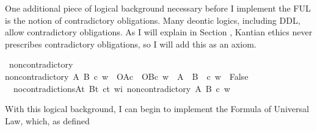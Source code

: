 \begin{isabellebody}
%
%
\begin{isamarkuptext}%
One additional piece of logical background necessary before I implement the FUL is the 
notion of contradictory obligations. Many deontic logics, including DDL, allow contradictory
obligations. As I will explain in Section , Kantian ethics never prescribes contradictory
obligations, so I will add this as an axiom.%
\end{isamarkuptext}\isamarkuptrue%
\isamarkupfalse%
\ non{\isacharunderscore}contradictory\ \ \isanewline
{\isachardoublequoteopen}non{\isacharunderscore}contradictory\ A\ B\ c\ w\ {\isasymequiv}\ {\isacharparenleft}{\isacharparenleft}O{\isacharbraceleft}A{\isacharbar}c{\isacharbraceright}\ \isactrlbold {\isasymand}\ O{\isacharbraceleft}B{\isacharbar}c{\isacharbraceright}{\isacharparenright}\ w{\isacharparenright}\ {\isasymlongrightarrow}\ {\isasymnot}{\isacharparenleft}{\isacharparenleft}A\ \isactrlbold {\isasymand}\ {\isacharparenleft}B\ \isactrlbold {\isasymand}\ c{\isacharparenright}{\isacharparenright}\ w\ {\isasymlongrightarrow}\ False{\isacharparenright}{\isachardoublequoteclose}\isanewline
%
\isanewline
\isanewline
{}\isamarkupfalse%
\ \ no{\isacharunderscore}contradictions{\isacharcolon}{\isachardoublequoteopen}{\isasymforall}A{\isacharcolon}{\isacharcolon}t{\isachardot}\ {\isasymforall}B{\isacharcolon}{\isacharcolon}t{\isachardot}\ {\isasymforall}c{\isacharcolon}{\isacharcolon}t{\isachardot}\ {\isasymforall}w{\isacharcolon}{\isacharcolon}i{\isachardot}\ non{\isacharunderscore}contradictory\ A\ B\ c\ w{\isachardoublequoteclose}\isanewline
%
%
\isadelimdocument
%
\endisadelimdocument
%
\isatagdocument
%
\isamarkuptrue%
%
\endisatagdocument
{\isafolddocument}%
%
\isadelimdocument
%
\endisadelimdocument
%
\begin{isamarkuptext}%
With this logical background, I can begin to implement the Formula of Universal Law, which, as defined 

\end{isamarkuptext}
\end{isabellebody}
